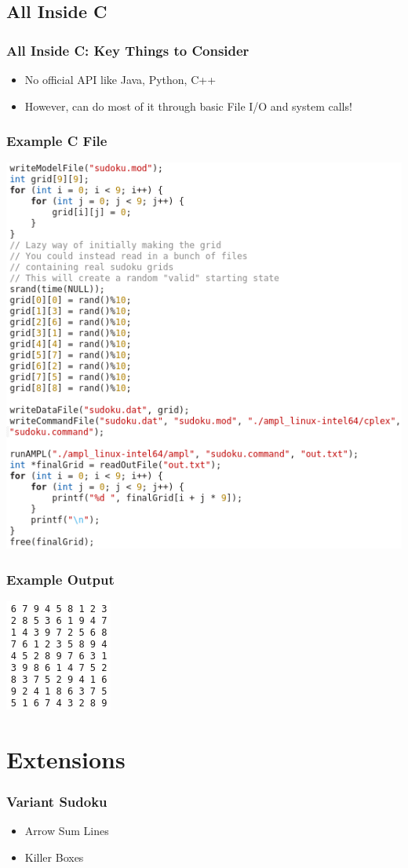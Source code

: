\documentclass{beamer}
\begin{document}
    \subsection{All Inside C}
    \begin{frame}
        \frametitle{All Inside C: Key Things to Consider}
        \begin{itemize}
            \item No official API like Java, Python, C++
            \item However, can do most of it through basic File I/O and system calls!
        \end{itemize}
    \end{frame}
    \begin{frame}
        \frametitle{Example C File}
        \centering
        \includegraphics[scale=.35]{figures/insideCCode.png}
    \end{frame}
    \begin{frame}
        \frametitle{Example Output}
        \centering
        \includegraphics[scale=.75]{figures/randomOutput.png}
    \end{frame}
    \section{Extensions}
    \begin{frame}
        \frametitle{Variant Sudoku}
        \begin{itemize}
            \item Arrow Sum Lines
            \item Killer Boxes
        \end{itemize}
    \end{frame}
\end{document}
